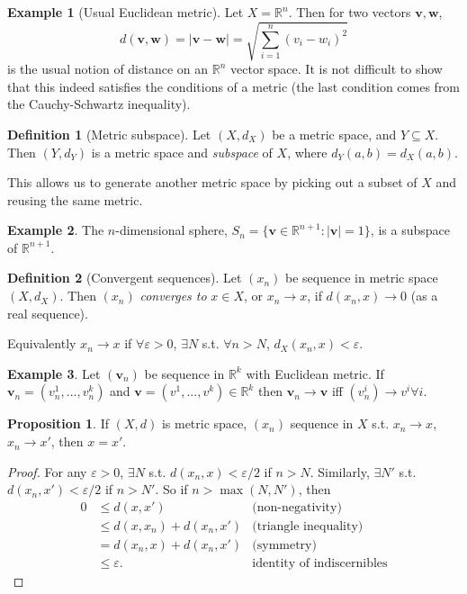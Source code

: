 \documentclass[a4paper,11pt]{article}
\theoremstyle{definition}
\newtheorem*{defn}{Definition}
\newtheorem*{prop}{Proposition}
\newtheorem*{ex}{Example}
\numberwithin{equation}{section}
\begin{document}
\begin{ex}[Usual Euclidean metric]
Let $X=\mathbb{R}^n$. Then for two vectors $\mathbf{v}, \mathbf{w}$,
\begin{equation}
    d(\mathbf{v},\mathbf{w}) = |\mathbf{v} - \mathbf{w}|=\sqrt{\sum_{i=1}^n (v_i-w_i)^2}
\end{equation}
is the usual notion of distance on an $\mathbb{R}^n$ vector space. It is not difficult to show that this indeed satisfies the conditions of a metric (the last condition comes from the Cauchy-Schwartz inequality).
\end{ex}

\begin{defn}[Metric subspace]
Let $(X,d_X)$ be a metric space, and $Y\subseteq X$. Then $(Y,d_Y)$ is a metric space and \emph{subspace} of $X$, where $d_Y(a,b)=d_X(a,b)$.
\end{defn}

This allows us to generate another metric space by picking out a subset of $X$ and reusing the same metric.

\begin{ex}
The $n$-dimensional sphere, $S_n = \{\mathbf{v}\in\mathbb{R}^{n+1}:|\mathbf{v}|=1\}$, is a subspace of $\mathbb{R}^{n+1}$.
\end{ex}

\begin{defn}[Convergent sequences]
Let $(x_n)$ be sequence in metric space $(X,d_X)$. Then $(x_n)$ \emph{converges to} $x\in X$, or $x_n\rightarrow x$, if $d(x_n,x)\rightarrow0$ (as a real sequence).

Equivalently $x_n\rightarrow x$ if $\forall\varepsilon >0$, $\exists N$ s.t. $\forall n>N$, $d_X(x_n,x)<\varepsilon$.
\end{defn}

\begin{ex}
Let $(\mathbf{v}_n)$ be sequence in $\mathbb{R}^k$ with Euclidean metric. If $\mathbf{v}_n = (v_n^1,...,v_n^k)$ and $\mathbf{v} = (v^1,...,v^k)\in\mathbb{R}^k$ then $\mathbf{v}_n\rightarrow\mathbf{v}$ iff $(v^i_n)\rightarrow v^i\forall i$.
\end{ex}

\begin{prop}
If $(X,d)$ is metric space, $(x_n)$ sequence in $X$ s.t. $x_n\rightarrow x$, $x_n\rightarrow x'$, then $x=x'$.
\end{prop}
\begin{proof}
For any $\varepsilon>0$, $\exists N$ s.t. $d(x_n,x)<\varepsilon/2$ if $n>N$. Similarly, $\exists N'$ s.t. $d(x_n,x')<\varepsilon/2$ if $n>N'$. So if $n>\max(N,N')$, then
\begin{align*}
    0&\leq d(x,x')&\text{(non-negativity)}\\
    &\leq d(x,x_n)+d(x_n,x')&\text{(triangle inequality)}\\
    &=d(x_n,x)+d(x_n,x')&\text{(symmetry)}\\
    &\leq \varepsilon.&\text{identity of indiscernibles}
\end{align*}
\end{proof}
\end{document}
